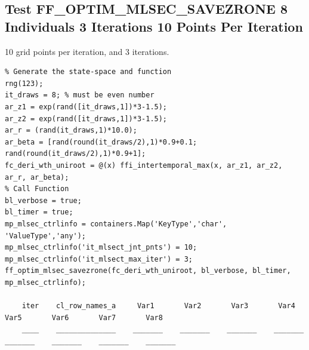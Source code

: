 \documentclass[
]{book}
\begin{document}
\hypertarget{test-ff_optim_mlsec_savezrone-8-individuals-3-iterations-10-points-per-iteration}{%
\subsection{Test FF\_OPTIM\_MLSEC\_SAVEZRONE 8 Individuals 3 Iterations 10 Points Per Iteration}\label{test-ff_optim_mlsec_savezrone-8-individuals-3-iterations-10-points-per-iteration}}

10 grid points per iteration, and 3 iterations.

\begin{verbatim}
% Generate the state-space and function
rng(123);
it_draws = 8; % must be even number
ar_z1 = exp(rand([it_draws,1])*3-1.5);
ar_z2 = exp(rand([it_draws,1])*3-1.5);
ar_r = (rand(it_draws,1)*10.0);
ar_beta = [rand(round(it_draws/2),1)*0.9+0.1; rand(round(it_draws/2),1)*0.9+1]; 
fc_deri_wth_uniroot = @(x) ffi_intertemporal_max(x, ar_z1, ar_z2, ar_r, ar_beta);
% Call Function
bl_verbose = true;
bl_timer = true;
mp_mlsec_ctrlinfo = containers.Map('KeyType','char', 'ValueType','any');
mp_mlsec_ctrlinfo('it_mlsect_jnt_pnts') = 10;
mp_mlsec_ctrlinfo('it_mlsect_max_iter') = 3;
ff_optim_mlsec_savezrone(fc_deri_wth_uniroot, bl_verbose, bl_timer, mp_mlsec_ctrlinfo);

    iter    cl_row_names_a     Var1       Var2       Var3       Var4       Var5       Var6       Var7       Var8  
    ____    ______________    _______    _______    _______    _______    _______    _______    _______    _______


\end{verbatim}
\end{document}
